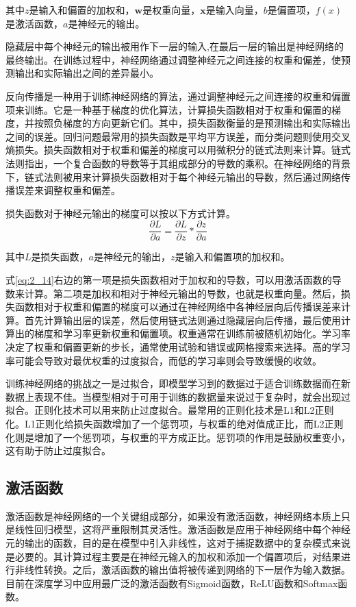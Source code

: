 其中$z$是输入和偏置的加权和，$\mathbf w$是权重向量，$\mathbf x$是输入向量，$b$是偏置项，$f(x)$是激活函数，$a$是神经元的输出。

隐藏层中每个神经元的输出被用作下一层的输入,在最后一层的输出是神经网络的最终输出。在训练过程中，神经网络通过调整神经元之间连接的权重和偏差，使预测输出和实际输出之间的差异最小。

反向传播是一种用于训练神经网络的算法，通过调整神经元之间连接的权重和偏置项来训练。它是一种基于梯度的优化算法，计算损失函数相对于权重和偏置的梯度，并按照负梯度的方向更新它们。其中，损失函数衡量的是预测输出和实际输出之间的误差。回归问题最常用的损失函数是平均平方误差，而分类问题则使用交叉熵损失。损失函数相对于权重和偏差的梯度可以用微积分的链式法则来计算。链式法则指出，一个复合函数的导数等于其组成部分的导数的乘积。在神经网络的背景下，链式法则被用来计算损失函数相对于每个神经元输出的导数，然后通过网络传播误差来调整权重和偏差。

损失函数对于神经元输出的梯度可以按以下方式计算。
\begin{equation}
\label{eq:2_14}
\frac{\partial L}{\partial a} = \frac{\partial L}{\partial z} * \frac{\partial z}{\partial a}
\end{equation}


其中$L$是损失函数，$a$是神经元的输出，$z$是输入和偏置项的加权和。

式\ref{eq:2_14}右边的第一项是损失函数相对于加权和的导数，可以用激活函数的导数来计算。第二项是加权和相对于神经元输出的导数，也就是权重向量。然后，损失函数相对于权重和偏置的梯度可以通过在神经网络中各神经层向后传播误差来计算。首先计算输出层的误差，然后使用链式法则通过隐藏层向后传播，最后使用计算出的梯度和学习率更新权重和偏置项。权重通常在训练前被随机初始化。学习率决定了权重和偏置更新的步长，通常使用试验和错误或网格搜索来选择。高的学习率可能会导致对最优权重的过度拟合，而低的学习率则会导致缓慢的收敛。

训练神经网络的挑战之一是过拟合，即模型学习到的数据过于适合训练数据而在新数据上表现不佳。当模型相对于可用于训练的数据量来说过于复杂时，就会出现过拟合。正则化技术可以用来防止过度拟合。最常用的正则化技术是L1和L2正则化。L1正则化给损失函数增加了一个惩罚项，与权重的绝对值成正比，而L2正则化则是增加了一个惩罚项，与权重的平方成正比。惩罚项的作用是鼓励权重变小，这有助于防止过度拟合。

\subsection{激活函数}

激活函数是神经网络的一个关键组成部分，如果没有激活函数，神经网络本质上只是线性回归模型，这将严重限制其灵活性。激活函数是应用于神经网络中每个神经元的输出的函数，目的是在模型中引入非线性，这对于捕捉数据中的复杂模式来说是必要的。其计算过程主要是在神经元输入的加权和添加一个偏置项后，对结果进行非线性转换。之后，激活函数的输出值将被传递到网络的下一层作为输入数据。目前在深度学习中应用最广泛的激活函数有Sigmoid函数，ReLU函数和Softmax函数。

